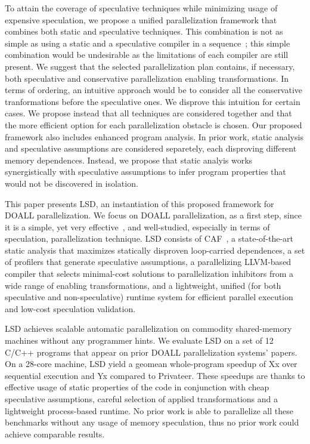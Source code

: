 To attain the coverage of speculative techniques while minimizing usage of
expensive speculation,
we propose a unified parallelization framework that combines both static and
speculative techniques.
%
This combination is not as simple as using a static and a speculative compiler
in a sequence~\cite{clusterDOALL,...}; this simple combination would be
undesirable as the limitations of each compiler are still present.
%
We suggest that the selected parallelization plan contains, if necessary, both
speculative and conservative parallelization enabling transformations.
%
In terms of ordering, an intuitive approach would be to consider all the
conservative tranformations before the speculative ones. We disprove this
intuition for certain cases. We propose instead that all techniques are
considered together and that the more efficient option for each parallelization
obstacle is chosen.
%
Our proposed framework also includes enhanced program analysis.  In prior work,
static analysis and speculative assumptions are considered separetely, each
disproving different memory dependences. Instead, we propose that static analyis
works synergistically with speculative assumptions to infer program properties
that would not be discovered in isolation.


This paper presents LSD, an instantiation of this proposed framework for DOALL
parallelization. We focus on DOALL parallelization, as a first step, since it is
a simple, yet very effective~\cite{Uncovering Mahlke paper}, and well-studied,
especially in terms of speculation, parallelization technique.
%
LSD consists of CAF~\cite{..}, a state-of-the-art static analysis that maximizes
statically disproven loop-carried dependences, a set of profilers that generate
speculative assumptions, a parallelizing LLVM-based compiler that selects
minimal-cost solutions to parallelization inhibitors from a wide range of
enabling transformations, and a lightweight, unified (for both speculative and
non-speculative) runtime system for efficient parallel execution and low-cost
speculation validation.
%

LSD achieves scalable automatic parallelization on commodity shared-memory
machines without any programmer hints.  We evaluate LSD on a set of 12 C/C++
programs that appear on prior DOALL parallelization systems' papers. On a
28-core machine, LSD yield a geomean whole-program speedup of Xx over sequential
execution and Yx compared to Privateer.
These speedups are thanks to effective usage of static properties of the code in
conjunction with cheap speculative assumptions, careful selection of applied
transformations and a lightweight process-based runtime.  No prior work is able
to parallelize all these benchmarks without any usage of memory speculation,
thus no prior work could achieve comparable results.
